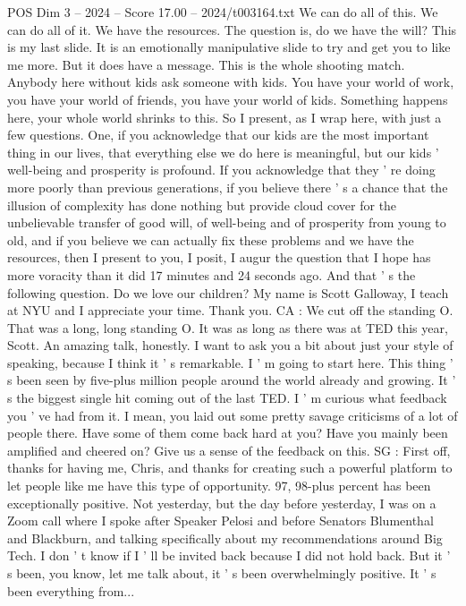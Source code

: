 \begin{textsample}{POS Dim 3 – 2024 – Score 17.00 – 2024/t003164.txt}
We can do all of this.
We can do all of it.
We have the resources.
The question is, do we have the will?
This is my last slide.
It is an emotionally manipulative slide to try and get you to like me more.
But it does have a message.
This is the whole shooting match.
Anybody here without kids ask someone with kids.
You have your world of work, you have your world of friends, you have your world of kids.
Something happens here, your whole world shrinks to this.
So I present, as I wrap here, with just a few questions.
One, if you acknowledge that our kids are the most important thing in our lives, that everything else we do here is meaningful, but our kids ' well-being and prosperity is profound.
If you acknowledge that they ' re doing more poorly than previous generations, if you believe there ' s a chance that the illusion of complexity has done nothing but provide cloud cover for the unbelievable transfer of good will, of well-being and of prosperity from young to old, and if you believe we can actually fix these problems and we have the resources, then I present to you, I posit, I augur the question that I hope has more voracity than it did 17 minutes and 24 seconds ago.
And that ' s the following question.
Do we love our children?
My name is Scott Galloway, I teach at NYU and I appreciate your time.
Thank you.
CA : We cut off the standing O.
That was a long, long standing O.
It was as long as there was at TED this year, Scott.
An amazing talk, honestly.
I want to ask you a bit about just your style of speaking, because I think it ' s remarkable.
I ' m going to start here.
This thing ' s been seen by five-plus million people around the world already and growing.
It ' s the biggest single hit coming out of the last TED.
I ' m curious what feedback you ' ve had from it.
I mean, you laid out some pretty savage criticisms of a lot of people there.
Have some of them come back hard at you?
Have you mainly been amplified and cheered on?
Give us a sense of the feedback on this.
SG : First off, thanks for having me, Chris, and thanks for creating such a powerful platform to let people like me have this type of opportunity. 97, 98-plus percent has been exceptionally positive.
Not yesterday, but the day before yesterday, I was on a Zoom call where I spoke after Speaker Pelosi and before Senators Blumenthal and Blackburn, and talking specifically about my recommendations around Big Tech.
I don ' t know if I ' ll be invited back because I did not hold back.
But it ' s been, you know, let me talk about, it ' s been overwhelmingly positive.
It ' s been everything from...

\end{textsample}
